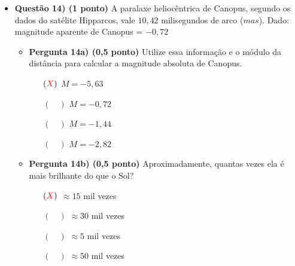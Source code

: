 \documentclass[a4paper, 12pt]{article}
\newcommand{\red}[1]{\textcolor{red}{#1}}
\begin{document}
\begin{flushleft}
\begin{itemize}
            \item \textbf{Questão 14) (1 ponto)} A paralaxe heliocêntrica de Canopus, segundo os dados do satélite Hipparcos, vale $10,42$ milisegundos de arco ($mas$). \linebreak\linebreak Dado: magnitude aparente de Canopus = $-0,72$
                \begin{itemize}
                    \item \textbf{Pergunta 14a) (0,5 ponto)} Utilize essa informação e o módulo da distância para calcular a magnitude absoluta de Canopus.
                        \begin{itemize}
                            \item[$(\red{X})$] $M = -5,63$
                            \item[$(\quad)$] $M = -0,72$
                            \item[$(\quad)$] $M = -1,44$
                            \item[$(\quad)$] $M = -2,82$
                        \end{itemize}
                    \item \textbf{Pergunta 14b) (0,5 ponto)} Aproximadamente, quantas vezes ela é mais brilhante do que o Sol?
                        \begin{itemize}
                            \item[$(\red{X})$] $\approx 15$ mil vezes
                            \item[$(\quad)$] $\approx 30$ mil vezes
                            \item[$(\quad)$] $\approx 5$ mil vezes
                            \item[$(\quad)$] $\approx 50$ mil vezes
                        \end{itemize}
                \end{itemize}
            

\end{itemize}
\end{flushleft}
\end{document}
